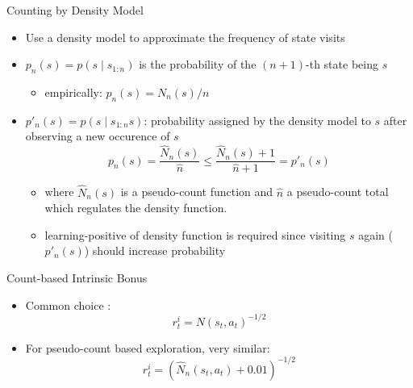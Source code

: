 \begin{frame}[c]{Counting by Density Model }
	
	\begin{itemize}
		\item Use a density model to approximate the frequency of state visits
		\item $p_n(s) = p(s \mid s_{1:n})$ is the probability of the $(n+1)$-th state being $s$
		\begin{itemize}
			\item empirically: $p_n(s) = N_n(s) / n$
		\end{itemize}
		\item $p'_n(s) = p(s \mid s_{1:n} s)$: probability assigned by the density model to $s$ after observing a new occurence of $s$
		$$p_n(s) =  \frac{\hat{N}_n(s)}{\hat{n}} \leq \frac{\hat{N}_n(s) + 1}{\hat{n} + 1} = p'_n(s)$$
		\begin{itemize}
			\item where $\hat{N}_n(s)$ is a pseudo-count function and $\hat{n}$ a pseudo-count total which regulates the density function.
			\item learning-positive of density function is required since visiting $s$ again ($p'_n(s)$) should increase probability
		\end{itemize}
	\end{itemize}
	
\end{frame}
\begin{frame}[c]{Count-based Intrinsic Bonus}
	
	\begin{itemize}
		\item Common choice :
		$$r_t^i = N(s_t, a_t)^{-1/2}$$
		\item For pseudo-count based exploration, very similar:
		$$r_t^i = (\hat{N}_n (s_t, a_t) + 0.01)^{-1/2} $$
	\end{itemize}
	
\end{frame}

